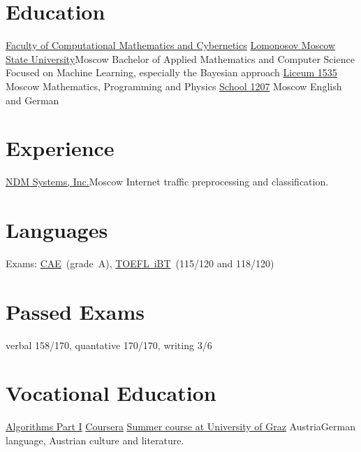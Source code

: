\documentclass[11pt,a4paper,oneside,roman]{moderncv}
\begin{document}
\makecvtitle

\section{Education}
        {\href{http://en.cs.msu.ru/}
          {Faculty of Computational Mathematics and Cybernetics}
        }
        {\href{http://en.cs.msu.ru/}{Lomonosov Moscow State University}}{Moscow}
        {Bachelor of Applied Mathematics and Computer Science}
        {Focused on Machine Learning, especially the Bayesian approach}
        {\href{http://liceum1535.ru/}{Liceum 1535}}
        {Moscow}
        {}{Mathematics, Programming and Physics}
        {\href{http://liceum1535.ru/}{School 1207}}
        {Moscow}
        {}{English and German}
\section{Experience}
        {\href{http://www.ndmsystems.com}{NDM Systems, Inc.}}{Moscow}
        {}{Internet traffic preprocessing and classification.}

\section{Languages}
  {Exams:
    \href{http://www.cambridgeenglish.org/exams/advanced/}{CAE}~(grade~A),
    \href{http://www.ets.org/toefl}{TOEFL~iBT}~(115/120 and 118/120)
  }

\section{Passed Exams}
        {verbal 158/170, quantative 170/170, writing 3/6}
        {}{}{}

\section{Vocational Education}
        {\href{https://www.coursera.org/course/algs4partI}{Algorithms Part I}}
        {\href{https://www.coursera.org/course/algs4partI}{Coursera}}
        {}{}{}
        {\href{http://treffpunktsprachen.uni-graz.at/en/}
          {Summer course at University of Graz}}
        {Austria}{}{German language, Austrian culture and literature.}
\end{document}
